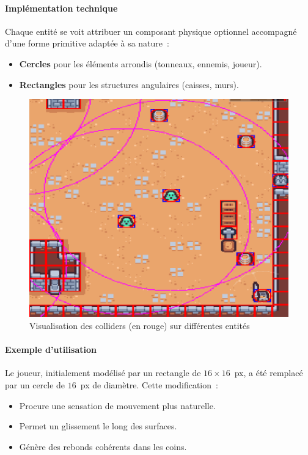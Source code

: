 \documentclass[a4paper,11pt]{article}
\begin{document}
\paragraph{Implémentation technique} 
Chaque entité se voit attribuer un composant physique optionnel accompagné d'une forme primitive adaptée à sa nature~:
\begin{itemize}
    \item \textbf{Cercles} pour les éléments arrondis (tonneaux, ennemis, joueur).
    \item \textbf{Rectangles} pour les structures angulaires (caisses, murs).
\end{itemize}
\begin{figure}[ht]
    \centering
    \includegraphics[width=0.75\linewidth]{./img/debugCollider.png}
    \caption{Visualisation des colliders (en rouge) sur différentes entités}
    \label{fig:colliders_exemple}
\end{figure}

\paragraph{Exemple d'utilisation} 
Le joueur, initialement modélisé par un rectangle de \(16 \times 16\)~px, a été remplacé par un cercle de \(16\)~px de diamètre. Cette modification~:
\begin{itemize}
    \item Procure une sensation de mouvement plus naturelle.
    \item Permet un glissement le long des surfaces.
    \item Génère des rebonds cohérents dans les coins.
\end{itemize}
\end{document}
